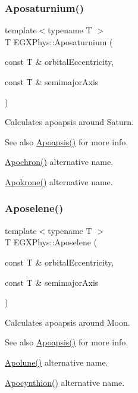 \subsubsection{\texorpdfstring{Aposaturnium()}{Aposaturnium()}}
{\footnotesize\ttfamily template$<$typename T $>$ \\
T E\+G\+X\+Phys\+::\+Aposaturnium (\begin{DoxyParamCaption}\item[{const T \&}]{orbital\+Eccentricity,  }\item[{const T \&}]{semimajor\+Axis }\end{DoxyParamCaption})}



Calculates apoapsis around Saturn. 

\begin{DoxySeeAlso}{See also}
\hyperlink{group___e_g_x_phys-_apoapsis_gaf962e650bf84a568458e8eb39b1c61ba}{Apoapsis()} for more info. 

\hyperlink{group___e_g_x_phys-_apoapsis_gae4ea146039e6f32022321f0998e715e8}{Apochron()} alternative name. 

\hyperlink{group___e_g_x_phys-_apoapsis_ga98557a8d49aa129c29e652c4758334d1}{Apokrone()} alternative name. 
\end{DoxySeeAlso}
\mbox{\label{group___e_g_x_phys-_apoapsis_gab61f3b2d6a5be3f62f5fb6dfdf802014}} 
\subsubsection{\texorpdfstring{Aposelene()}{Aposelene()}}
{\footnotesize\ttfamily template$<$typename T $>$ \\
T E\+G\+X\+Phys\+::\+Aposelene (\begin{DoxyParamCaption}\item[{const T \&}]{orbital\+Eccentricity,  }\item[{const T \&}]{semimajor\+Axis }\end{DoxyParamCaption})}



Calculates apoapsis around Moon. 

\begin{DoxySeeAlso}{See also}
\hyperlink{group___e_g_x_phys-_apoapsis_gaf962e650bf84a568458e8eb39b1c61ba}{Apoapsis()} for more info. 

\hyperlink{group___e_g_x_phys-_apoapsis_gacc68b49812c38394611e1ef3a8bf0e3e}{Apolune()} alternative name. 

\hyperlink{group___e_g_x_phys-_apoapsis_ga557bb4d1a0ce7f17aaa8f8de469d4f52}{Apocynthion()} alternative name. 
\end{DoxySeeAlso}
\mbox{\label{group___e_g_x_phys-_apoapsis_ga6efaf5c9379f1085fa6e51bf97356124}} 
